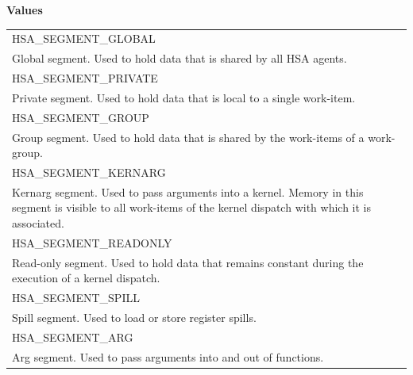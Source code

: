 \documentclass[final,oneside]{book}
\newcommand{\reftyp}[1]{#1}
\newcommand{\refenu}[1]{\reftyp{#1}}
\begin{document}
\noindent\textbf{Values}\\[-5mm]
\begin{longtable}{@{\hspace{2em}}p{\linewidth-2em}}
\hspace{-2em}\refenu{HSA_\-SEGMENT_\-GLOBAL}\\Global segment. Used to hold data that is shared by all HSA agents.\\[2mm]
\hspace{-2em}\refenu{HSA_\-SEGMENT_\-PRIVATE}\\Private segment. Used to hold data that is local to a single work-item.\\[2mm]
\hspace{-2em}\refenu{HSA_\-SEGMENT_\-GROUP}\\Group segment. Used to hold data that is shared by the work-items of a work-group.\\[2mm]
\hspace{-2em}\refenu{HSA_\-SEGMENT_\-KERNARG}\\Kernarg segment. Used to pass arguments into a kernel. Memory in this segment is visible to all work-items of the kernel dispatch with which it is associated.\\[2mm]
\hspace{-2em}\refenu{HSA_\-SEGMENT_\-READONLY}\\Read-only segment. Used to hold data that remains constant during the execution of a kernel dispatch.\\[2mm]
\hspace{-2em}\refenu{HSA_\-SEGMENT_\-SPILL}\\Spill segment. Used to load or store register spills.\\[2mm]
\hspace{-2em}\refenu{HSA_\-SEGMENT_\-ARG}\\Arg segment. Used to pass arguments into and out of functions.
\end{longtable}
\end{document}
